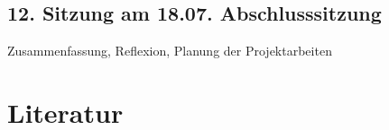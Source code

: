 \documentclass[
  ngerman,
]{article}
\begin{document}
\hypertarget{sitzung-am-18.07.-abschlusssitzung}{%
\subsection*{12. Sitzung am 18.07. \textbar{} Abschlusssitzung}\label{sitzung-am-18.07.-abschlusssitzung}}

Zusammenfassung, Reflexion, Planung der Projektarbeiten

\hypertarget{literatur}{%
\section*{Literatur}\label{literatur}}

\hypertarget{refs}{}
\end{document}
